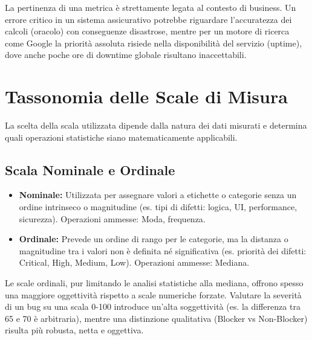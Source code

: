 \begin{notaprof}
La pertinenza di una metrica è strettamente legata al contesto di business. Un errore critico in un sistema assicurativo potrebbe riguardare l'accuratezza dei calcoli (oracolo) con conseguenze disastrose, mentre per un motore di ricerca come Google la priorità assoluta risiede nella disponibilità del servizio (uptime), dove anche poche ore di downtime globale risultano inaccettabili.
\end{notaprof}

\section{Tassonomia delle Scale di Misura}
La scelta della scala utilizzata dipende dalla natura dei dati misurati e determina quali operazioni statistiche siano matematicamente applicabili.

\subsection{Scala Nominale e Ordinale}
\begin{itemize}
    \item \textbf{Nominale:} Utilizzata per assegnare valori a etichette o categorie senza un ordine intrinseco o magnitudine (es. tipi di difetti: logica, UI, performance, sicurezza). Operazioni ammesse: Moda, frequenza.
    \item \textbf{Ordinale:} Prevede un ordine di rango per le categorie, ma la distanza o magnitudine tra i valori non è definita né significativa (es. priorità dei difetti: Critical, High, Medium, Low). Operazioni ammesse: Mediana.
\end{itemize}

\begin{notaprof}
Le scale ordinali, pur limitando le analisi statistiche alla mediana, offrono spesso una maggiore oggettività rispetto a scale numeriche forzate. Valutare la severità di un bug su una scala 0-100 introduce un'alta soggettività (es. la differenza tra 65 e 70 è arbitraria), mentre una distinzione qualitativa (Blocker vs Non-Blocker) risulta più robusta, netta e oggettiva.
\end{notaprof}

